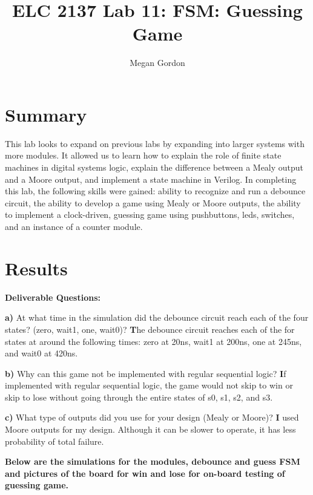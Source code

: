 \documentclass[11pt]{article}
\begin{document}
\title{ELC 2137 Lab 11: FSM: Guessing Game}
\author{Megan Gordon}

\maketitle


\section*{Summary}

This lab looks to expand on previous labs by expanding into larger systems with more modules. It allowed us to learn how to explain the role of finite state machines in digital systems logic, explain the difference between a Mealy output and a Moore output, and implement a state machine in Verilog. In completing this lab, the following skills were gained: ability to recognize and run a debounce circuit, the ability to develop a game using Mealy or Moore outputs, the ability to implement a clock-driven, guessing game using pushbuttons, leds, switches, and an instance of a counter module. 



\section*{Results}

\textbf{Deliverable Questions:}

\medskip
\textbf{a)} At what time in the simulation did the debounce circuit reach each of the four states? (zero, wait1, one, wait0)?
\textbf	The debounce circuit reaches each of the for states at around the following times: zero at 20ns, wait1 at 200ns, one at 245ns, and wait0 at 420ns. 

\textbf{b)} Why can this game not be implemented with regular sequential logic?
\textbf	If implemented with regular sequential logic, the game would not skip to win or skip to lose without going through the entire states of s0, s1, s2, and s3. 


\textbf{c)} What type of outputs did you use for your design (Mealy or Moore)? 
\textbf	I used Moore outputs for my design. Although it can be slower to operate, it has less probability of total failure.
\clearpage

\textbf{Below are the simulations for the modules, debounce and guess FSM and pictures of the board for win and lose for on-board testing of guessing game.} 
\bigskip
\bigskip
\bigskip
\end{document}
